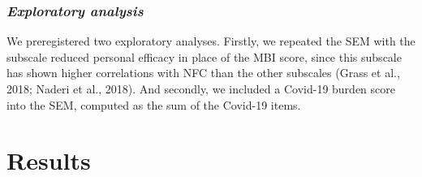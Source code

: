 \documentclass[
  english,
  man]{apa6}
\begin{document}
\hypertarget{exploratory-analysis}{%
\subsubsection{\texorpdfstring{\emph{Exploratory analysis}}{Exploratory analysis}}\label{exploratory-analysis}}

We preregistered two exploratory analyses.
Firstly, we repeated the SEM with the subscale reduced personal efficacy in place of the MBI score, since this subscale has shown higher correlations with NFC than the other subscales (Grass et al., 2018; Naderi et al., 2018).
And secondly, we included a Covid-19 burden score into the SEM, computed as the sum of the Covid-19 items.

\hypertarget{results}{%
\section{Results}\label{results}}

\begingroup\fontsize{10}{12}\selectfont
\end{document}
